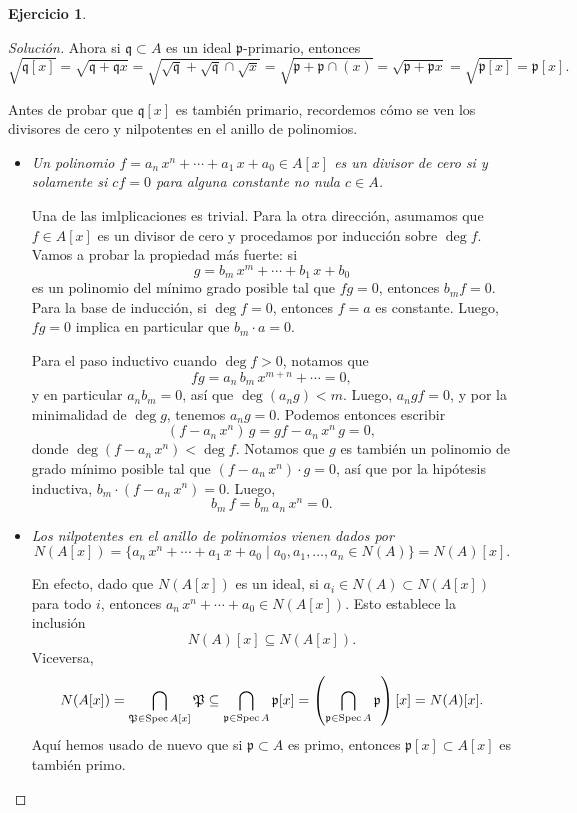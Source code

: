\documentclass{article}
\theoremstyle{definition}
\newtheorem{ejerc}{Ejercicio}
\newenvironment{solucion}{\begin{proof}[Solución]}{\end{proof}}
\begin{document}
\begin{ejerc}
\begin{solucion}
    Ahora si $\mathfrak{q} \subset A$ es un ideal $\mathfrak{p}$-primario,
    entonces
    \[ \sqrt{\mathfrak{q}[x]} =
       \sqrt{\mathfrak{q} + \mathfrak{q}x} =
       \sqrt{\sqrt{\mathfrak{q}} + \sqrt{\mathfrak{q}} \cap \sqrt{x}} =
       \sqrt{\mathfrak{p} + \mathfrak{p}\cap (x)} =
       \sqrt{\mathfrak{p} + \mathfrak{p}x} =
       \sqrt{\mathfrak{p}[x]} = \mathfrak{p}[x]. \]

    Antes de probar que $\mathfrak{q}[x]$ es también primario, recordemos cómo
    se ven los divisores de cero y nilpotentes en el anillo de polinomios.

    \begin{itemize}
    \item \emph{Un polinomio $f = a_n\,x^n + \cdots + a_1\,x + a_0 \in A [x]$ es
        un divisor de cero si y solamente si $cf = 0$ para alguna constante no
        nula $c \in A$.}

      Una de las imlplicaciones es trivial. Para la otra dirección, asumamos que
      $f \in A[x]$ es un divisor de cero y procedamos por inducción sobre
      $\deg f$. Vamos a probar la propiedad más fuerte: si
      $$g = b_m\,x^m + \cdots + b_1\,x + b_0$$
      es un polinomio del mínimo grado posible tal que $fg = 0$, entonces
      $b_m f = 0$. Para la base de inducción, si $\deg f = 0$, entonces $f = a$
      es constante. Luego, $fg = 0$ implica en particular que $b_m\cdot a = 0$.

      Para el paso inductivo cuando $\deg f > 0$, notamos que
      $$fg = a_n\,b_m\,x^{m+n} + \cdots = 0,$$
      y en particular $a_n b_m = 0$, así que $\deg (a_n g) < m$. Luego,
      $a_n g f = 0$, y por la minimalidad de $\deg g$, tenemos $a_n g =
      0$. Podemos entonces escribir
      $$(f - a_n\,x^n)\,g = gf - a_n\,x^n\,g = 0,$$
      donde $\deg (f - a_n\,x^n) < \deg f$. Notamos que $g$ es también un
      polinomio de grado mínimo posible tal que $(f - a_n\,x^n)\cdot g = 0$, así
      que por la hipótesis inductiva, $b_m\cdot (f - a_n\,x^n) = 0$. Luego,
      $$b_m\,f = b_m\,a_n\,x^n = 0.$$

    \item \emph{Los nilpotentes en el anillo de polinomios vienen dados por
        \[ N (A [x]) =
           \{ a_n\,x^n + \cdots + a_1\,x + a_0 \mid a_0, a_1, \ldots, a_n \in N (A) \} =
           N (A) [x]. \]}

      En efecto, dado que $N (A [x])$ es un ideal, si
      $a_i \in N (A) \subset N (A [x])$ para todo $i$, entonces
      ${a_n\,x^n + \cdots + a_0 \in N (A[x])}$. Esto establece la inclusión
      $$N (A) [x] \subseteq N (A[x]).$$
      Viceversa,
      \[ N (A [x]) =
         \bigcap_{\mathfrak{P} \in \operatorname{Spec} A [x]} \mathfrak{P} \subseteq \bigcap_{\mathfrak{p} \in \operatorname{Spec} A} \mathfrak{p} [x] =
         \left(\bigcap_{\mathfrak{p} \in \operatorname{Spec} A} \mathfrak{p}\right) [x] =
         N (A) [x]. \]
      Aquí hemos usado de nuevo que si $\mathfrak{p} \subset A$ es primo,
      entonces $\mathfrak{p} [x] \subset A[x]$ es también primo.
    \end{itemize}


\end{solucion}
\end{ejerc}
\end{document}
